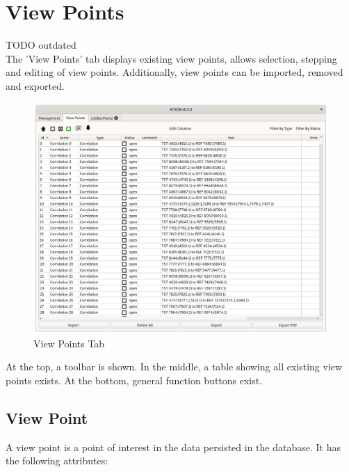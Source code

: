 \chapter{View Points}
\label{sec:view_points} 

TODO outdated \\


The 'View Points' tab displays existing view points, allows selection, stepping and editing of view points. Additionally, view points can be imported, removed and exported.

\begin{figure}[H]
    \hspace*{-2.5cm}
    \includegraphics[width=19cm]{figures/view_points.png}
  \caption{View Points Tab}
\end{figure}

At the top, a toolbar is shown. In the middle, a table showing all existing view points exists. At the bottom, general function buttons exist. \\

\section{View Point}

A view point is a point of interest in the data persisted in the database. It has the following attributes:

